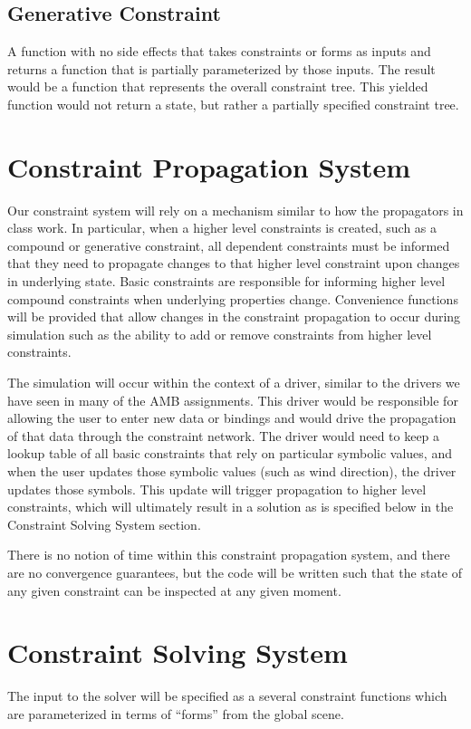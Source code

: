 \documentclass[a4paper,10pt]{article}
\begin{document}
\subsection{Generative Constraint}  A function with no side effects that takes 
constraints or forms as inputs and returns a function that is partially 
parameterized by those inputs.  The result would be a function that represents 
the overall constraint tree. This yielded function would not return a state, 
but rather a partially specified constraint tree.

\section{Constraint Propagation System}
Our constraint system will rely on a mechanism similar to how the propagators in 
class work. In particular, when a higher level constraints is created, such 
as a compound or generative constraint, all dependent constraints must be 
informed that they need to propagate changes to that higher level constraint 
upon changes in underlying state.  Basic constraints are responsible for 
informing higher level compound constraints when underlying properties change.  
Convenience functions will be provided that allow changes in the constraint 
propagation to occur during simulation such as the ability to add or remove 
constraints from higher level constraints.  

The simulation will occur within the context of a driver, similar to the drivers 
we have seen in many of the AMB assignments.  This driver would be responsible 
for allowing the user to enter new data or bindings and would drive the 
propagation of that data through the constraint network.  The driver would need 
to keep a lookup table of all basic constraints that rely on particular symbolic 
values, and when the user updates those symbolic values (such as wind 
direction), the driver updates those symbols.  This update will trigger 
propagation to higher level constraints, which will ultimately result 
in a solution as is specified below in the Constraint Solving System section.

There is no notion of time within this constraint propagation system, and there 
are no convergence guarantees, but the code will be written such that the state 
of any given constraint can be inspected at any given moment.

\section{Constraint Solving System}
The input to the solver will be specified as a several constraint functions 
which are parameterized in terms of “forms” from the global scene.
\end{document}
